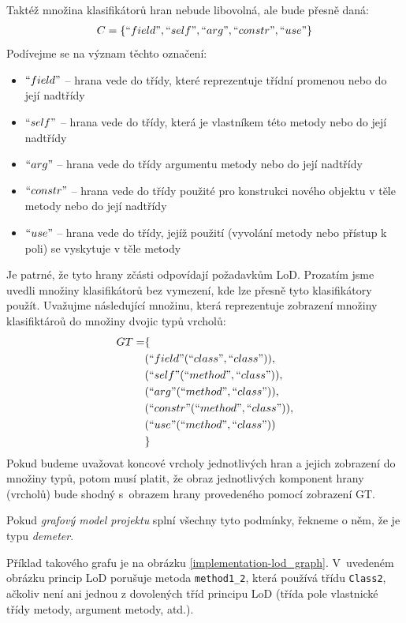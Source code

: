 Taktéž množina klasifikátorů hran nebude libovolná, ale bude přesně daná:
\begin{align*}
C = \{ ``field", ``self", ``arg", ``constr", ``use" \}
\end{align*}
Podívejme se na význam těchto označení:
\begin{itemize}
\item $``field"$ -- hrana vede do třídy, které reprezentuje třídní promenou nebo do její nadtřídy
\item $``self"$ -- hrana vede do třídy, která je vlastníkem této metody nebo do její nadtřídy
\item $``arg"$ -- hrana vede do třídy argumentu metody nebo do její nadtřídy
\item $``constr"$ -- hrana vede do třídy použité pro konstrukci nového objektu v těle metody nebo do její nadtřídy
\item $``use"$ -- hrana vede do třídy, jejíž použití (vyvolání metody nebo přístup k poli) se vyskytuje v těle metody
\end{itemize}
Je patrné, že tyto hrany zčásti odpovídají požadavkům LoD. Prozatím jsme uvedli množiny klasifikátorů bez vymezení, kde lze přesně tyto klasifikátory použít. Uvažujme následující množinu, která reprezentuje zobrazení množiny klasifiktároů do množiny dvojic typů vrcholů:
\begin{align*}
GT = &\{ \\
&(``field" (``class", ``class")), \\
&(``self" (``method", ``class")), \\
&(``arg" (``method", ``class")), \\
&(``constr" (``method", ``class")), \\
&(``use" (``method", ``class")) \\
&\}
\end{align*}
Pokud budeme uvažovat koncové vrcholy jednotlivých hran a jejich zobrazení do množiny typů, potom musí platit, že obraz jednotlivých komponent hrany (vrcholů) bude shodný s~obrazem hrany provedeného pomocí zobrazení GT.

Pokud \emph{grafový model projektu} splní všechny tyto podmínky, řekneme o něm, že je typu \emph{demeter}.

Příklad takového grafu je na obrázku \ref{implementation-lod_graph}. V~uvedeném obrázku princip LoD porušuje metoda \verb-method1_2-, která používá třídu \verb-Class2-, ačkoliv není ani jednou z dovolených tříd principu LoD (třída pole vlastnické třídy metody, argument metody, atd.).


